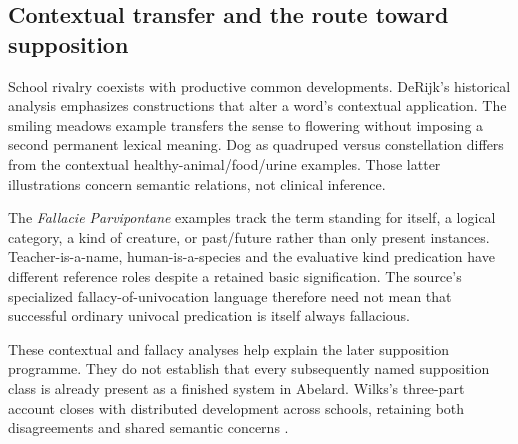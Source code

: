 \subsection{Contextual transfer and the route toward supposition}

School rivalry coexists with productive common developments.
DeRijk's historical analysis emphasizes constructions
that alter a word's contextual application.
The smiling meadows example transfers the sense to
flowering without imposing a second permanent lexical
meaning. Dog as quadruped versus constellation differs
from the contextual healthy-animal/food/urine examples.
Those latter illustrations concern semantic relations,
not clinical inference.

The \emph{Fallacie Parvipontane} examples track the
term standing for itself, a logical category, a kind
of creature, or past/future rather than only present
instances. Teacher-is-a-name, human-is-a-species and
the evaluative kind predication have different reference
roles despite a retained basic signification.
The source's specialized fallacy-of-univocation language
therefore need not mean that successful ordinary
univocal predication is itself always fallacious.

These contextual and fallacy analyses help explain the
later supposition programme. They do not establish
that every subsequently named supposition class is
already present as a finished system in Abelard.
Wilks's three-part account closes with distributed
development across schools, retaining both disagreements
and shared semantic concerns
\cite[pp.~149--151]{Wilks2007FordhamAbelard}.
